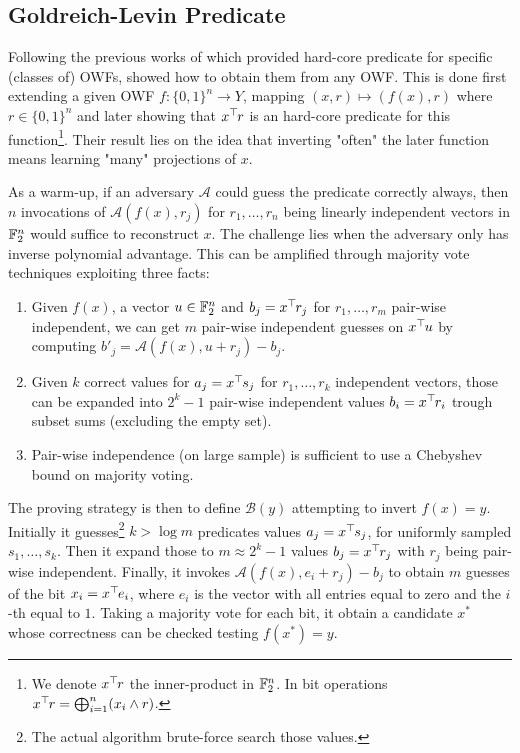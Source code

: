 \subsection{Goldreich-Levin Predicate}
Following the previous works of \cite{FOCS:BluMic82, FOCS:Yao82a} which provided hard-core predicate for specific (classes of) OWFs, \cite{STOC:GolLev89} showed how to obtain them from any OWF.
This is done first extending a given OWF $f : \{0,1\}^n \to Y$, mapping $(x, r) \mapsto (f(x), r)$ where $r \in \{0,1\}^n$ and later showing that $x^\top\hspace{-.1em} r$ is an hard-core predicate for this function\footnote{We denote $x^\top\hspace{-.1em} r$ the inner-product in $\mathbb{F}_2^n$. In bit operations $x^\top\hspace{-.1em} r = \bigoplus_{i = 1}^n (x_i \wedge r)$.}.
Their result lies on the idea that inverting "often" the later function means learning "many" projections of $x$.

As a warm-up, if an adversary $\mathcal{A}$ could guess the predicate correctly always, then $n$ invocations of $\mathcal{A}(f(x), r_j)$ for $r_1, \ldots, r_n$ being linearly independent vectors in $\mathbb{F}_2^n$ would suffice to reconstruct $x$.
The challenge lies when the adversary only has inverse polynomial advantage.
This can be amplified through majority vote techniques exploiting three facts:
\begin{enumerate}
	\item Given $f(x)$, a vector $u \in \mathbb{F}_2^n$ and $b_j = x^\top\hspace{-.1em} r_j$ for $r_1, \ldots, r_m$ pair-wise independent, we can get $m$ pair-wise independent guesses on $x^\top\hspace{-.1em} u$ by computing $b'_j = \mathcal{A}(f(x), u + r_j) - b_j$.
	
	\item Given $k$ correct values for $a_j = x^\top\hspace{-.1em} s_j$ for $r_1, \ldots, r_k$ independent vectors, those can be expanded into $2^k - 1$ pair-wise independent values $b_i = x^\top\hspace{-.1em} r_i$ trough subset sums (excluding the empty set).
	
	\item Pair-wise independence (on large sample) is sufficient to use a Chebyshev bound on majority voting.
\end{enumerate}
The proving strategy is then to define $\mathcal{B}(y)$ attempting to invert $f(x) = y$. Initially it guesses\footnote{The actual algorithm brute-force search those values.} $k > \log m$ predicates values $a_j = x^\top\hspace{-.1em} s_j$, for uniformly sampled $s_1, \ldots, s_k$.
Then it expand those to $m \approx 2^k - 1$ values $b_j = x^\top\hspace{-.1em} r_j$ with $r_j$ being pair-wise independent.
Finally, it invokes $\mathcal{A}(f(x), e_i + r_j) - b_j$ to obtain $m$ guesses of the bit $x_i = x^\top\hspace{-.1em} e_i$, where $e_i$ is the vector with all entries equal to zero and the $i$-th equal to $1$.
Taking a majority vote for each bit, it obtain a candidate $x^\ast$ whose correctness can be checked testing $f(x^\ast) = y$.

